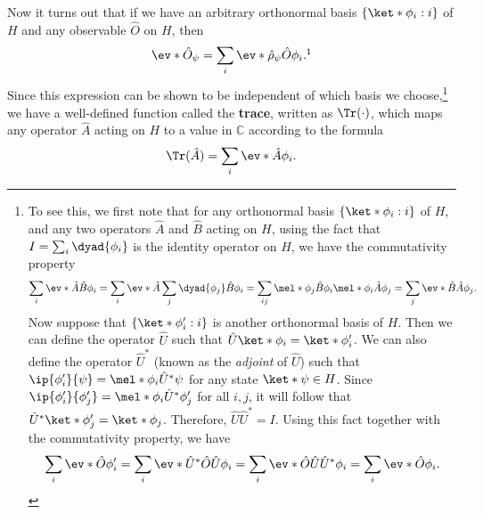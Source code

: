 \documentclass[12pt]{report}
\begin{document}
      Now it turns out that if we have an arbitrary orthonormal basis $\{\ket*{\phi_i}:i\}$ of $H$ and any observable $\hat{O}$ on $H$, then 
    \begin{equation}\label{exptrace}\ev*{\hat{O}}_\psi=\sum_{i}\ev*{\hat{\rho}_\psi\hat{O}}{\phi_i}.\protect\footnotemark
    \end{equation}
    Since this expression can be shown to be independent of
     which basis we choose,\footnote{To see this, we first note that for any orthonormal basis $\{\ket*{\phi_i}:i\}$ of $H$, and any two operators $\hat{A}$ and $\hat{B}$ acting on $H$, using the fact that $I=\sum_i\dyad{\phi_i}$ is the identity operator on $H$, we have the commutativity property $$\sum_i\ev*{\hat{A}\hat{B}}{\phi_i}=\sum_i\ev*{\hat{A}\sum_j\dyad{\phi_j}\hat{B}}{\phi_i}=\sum_{ij}\mel*{\phi_j}{\hat{B}}{\phi_i}\mel*{\phi_i}{\hat{A}}{\phi_j}=\sum_j\ev*{\hat{B}\hat{A}}{\phi_j}.$$ Now suppose that $\{\ket*{\phi_i'}:i\}$  is another orthonormal basis of $H$. Then we can define the operator $\hat{U}$ such that $\hat{U}\ket*{\phi_i}=\ket*{\phi_i'}$. We can also define the operator $\hat{U}^*$ (known as the \emph{adjoint} of $\hat{U}$) %
%
     such that $\ip{\phi_i'}{\psi}=\mel*{\phi_i}{\hat{U}^*}{\psi}$ for any state $\ket*{\psi}\in H$. Since $\ip{\phi_i'}{\phi_j'}=\mel*{\phi_i}{\hat{U}^*}{\phi_j'}$ for all $i, j$, it will follow that  $\hat{U}^*\ket*{\phi_j'}=\ket*{\phi_j}$. Therefore, $\hat{U}\hat{U}^*=I$. Using this fact together with the commutativity property, we have 
    $$\sum_i \ev*{\hat{O}}{\phi_i'}= \sum_i\ev*{\hat{U}^*\hat{O}\hat{U}}{\phi_i}
    =\sum_i\ev*{\hat{O}\hat{U}\hat{U}^*}{\phi_i}=\sum_i\ev*{\hat{O}}{\phi_i}.$$} 
     we have a well-defined function called the \textbf{trace}, written as $\Tr(\cdot)$, which maps any operator $\hat{A}$ acting on $H$ to a value in $\mathbb{C}$ according to the formula
    \begin{equation}\Tr (\hat{A})=\sum_i \ev*{\hat{A}}{\phi_i}.\label{tracedef}\end{equation}%
%
\end{document}
